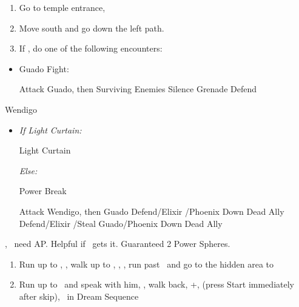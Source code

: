 \begin{enumerate}[resume]
	\item Go to temple entrance, \sd
	\item Move south and go down the left path.
	\item If \blitzloss, do one of the following encounters:
\end{enumerate}
\begin{encounters}
	\begin{itemize}
		\item Guado Fight:
		      \begin{itemize}
			      \tidusf Attack Guado, then Surviving Enemies
			      \rikkuf Silence Grenade
			      \yunaf Defend
		      \end{itemize}
	\end{itemize}
\end{encounters}
\begin{battle}[18000]{Wendigo}
	\begin{itemize}
		\tidusf Haste \tidus
		\tidusf Switch Weapon to Brotherhood
		\tidusf Attack Guado B (Top One)
		\item \textit{If Light Curtain:}
		      \begin{itemize}
			      \rikkuf Light Curtain \tidus
		      \end{itemize}
		      \textit{Else:}
		      \begin{itemize}
			      \switch{\rikku}{\auron}
			      \auronf Power Break
		      \end{itemize}
		      \tidusf Attack Wendigo, then Guado
		      \yunaf Defend/Elixir \tidus/Phoenix Down Dead Ally
		      \rikkuf Defend/Elixir \tidus/Steal Guado/Phoenix Down Dead Ally
		      \switch{\yuna}{\lulu}
	\end{itemize}
	\yuna, \tidus\ need AP. Helpful if \lulu\ gets it.
	Guaranteed 2 Power Spheres.
\end{battle}
\begin{enumerate}[resume]
	\item Run up to \rikku, \sd, walk up to \yuna, \sd, \save, run past \kimahri\ and go to the hidden area to 
	\item Run up to \auron\ and speak with him, \sd, walk back, \cs+\skippablefmv[1:00], (press Start immediately after skip), \sd\ in Dream Sequence
\end{enumerate}
\newpage